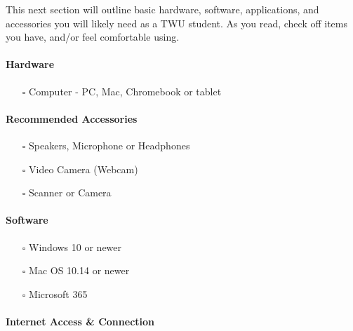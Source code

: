 \documentclass[
]{book}
\providecommand{\tightlist}{%
  \setlength{\itemsep}{0pt}\setlength{\parskip}{0pt}}
\theoremstyle{definition}
\theoremstyle{definition}
\theoremstyle{definition}
\theoremstyle{definition}
\theoremstyle{remark}
\begin{document}
This next section will outline basic hardware, software, applications, and accessories you will likely need as a TWU student. As you read, check off items you have, and/or feel comfortable using.

\hypertarget{hardware}{%
\paragraph*{Hardware}\label{hardware}}

\begin{itemize}
\tightlist
\item[$\square$]
  Computer - PC, Mac, Chromebook or tablet
\end{itemize}

\hypertarget{recommended-accessories}{%
\paragraph*{Recommended Accessories}\label{recommended-accessories}}

\begin{itemize}
\tightlist
\item[$\square$]
  Speakers, Microphone or Headphones\\
\item[$\square$]
  Video Camera (Webcam)\\
\item[$\square$]
  Scanner or Camera
\end{itemize}

\hypertarget{software}{%
\paragraph*{Software}\label{software}}

\begin{itemize}
\tightlist
\item[$\square$]
  Windows 10 or newer\\
\item[$\square$]
  Mac OS 10.14 or newer\\
\item[$\square$]
  Microsoft 365
\end{itemize}

\hypertarget{internet-access-connection}{%
\paragraph*{Internet Access \& Connection}\label{internet-access-connection}}
\end{document}
